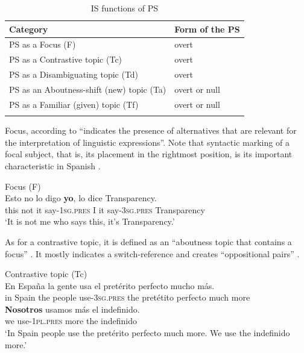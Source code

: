 \documentclass[output=paper]{langsci/langscibook}
\begin{document}
\begin{table}
 \caption{IS functions of PS}
\label{extab:pes:4}
\begin{tabular}{ll}
\lsptoprule
             Category &             Form of the PS\\
\midrule
     PS as a Focus (F)   &          overt\\
     PS as a Contrastive topic (Tc)   &      overt\\
     PS as a Disambiguating topic (Td)  &     overt\\
     PS as an Aboutness-shift (new) topic (Ta)  &   overt or null\\
     PS as a Familiar (given) topic (Tf)  &     overt or null\\
\lspbottomrule
\end{tabular}
\end{table}

Focus, according to \citet[18]{Krifka2007} ``indicates the presence of alternatives that are relevant for the interpretation of linguistic expressions''. Note that syntactic marking of a focal subject, that is, its placement in the rightmost position, is its important characteristic in Spanish .


\ea\label{ex:pes:5}
             Focus (F)\\
\gll Esto  no  lo  digo \textbf{{yo}},  lo  dice     Transparency.\\
       this  not  it  say-\textsc{1sg}.\textsc{pres}   I it   say-\textsc{3sg}.\textsc{pres} Transparency\\
\glt ‘It is not me who says this, it’s Transparency.’
\z

As for a contrastive topic, it is defined as an ``aboutness topic that contains a focus'' \citep[44]{Krifka2007}. It mostly indicates a switch-reference and creates ``oppositional pairs'' \citep[143]{Chocano2012} .


\ea\label{ex:pes:6}
             Contrastive topic (Tc)\\
\gll En Espa{\~n}a    la gente  usa     el pretérito perfecto mucho más.\\
     in Spain    the people  use-\textsc{3sg}.\textsc{pres} the pretétito perfecto  much more\\
\gll     \textbf{{Nosotros}} usamos    más    el indefinido.\\
         we    use-\textsc{1pl}.\textsc{pres} more    the indefinido\\
\glt ‘In Spain people use the pretérito perfecto much more. We use the indefinido more.’
\z
\end{document}

